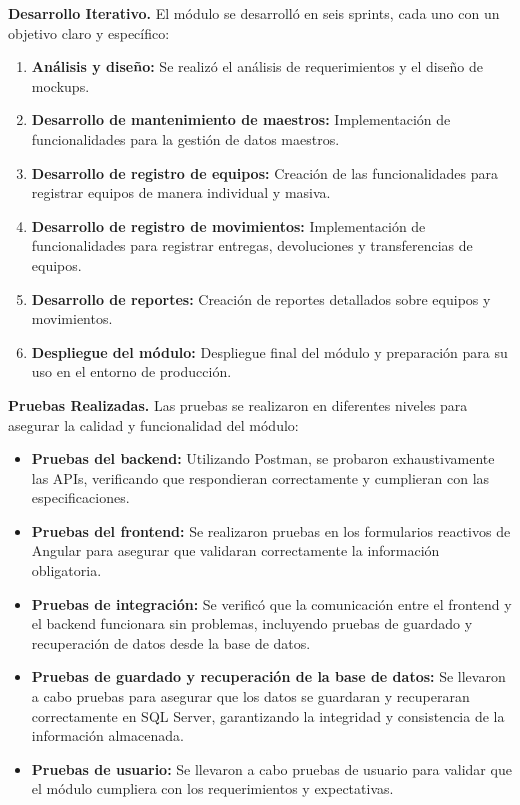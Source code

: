 \documentclass[stu, 12pt, letterpaper, donotrepeattitle, floatsintext, natbib]{apa7}
\begin{document}
\textbf{Desarrollo Iterativo. }El módulo se desarrolló en seis sprints, cada uno con un objetivo claro y específico:
\begin{enumerate}
    \item\textbf{Análisis y diseño: }Se realizó el análisis de requerimientos y el diseño de mockups.
    \item\textbf{Desarrollo de mantenimiento de maestros: }Implementación de funcionalidades para la gestión de datos maestros.
    \item\textbf{Desarrollo de registro de equipos: }Creación de las funcionalidades para registrar equipos de manera individual y masiva.
    \item\textbf{Desarrollo de registro de movimientos: }Implementación de funcionalidades para registrar entregas, devoluciones y
          transferencias de equipos.
    \item\textbf{Desarrollo de reportes: }Creación de reportes detallados sobre equipos y movimientos.
    \item\textbf{Despliegue del módulo: }Despliegue final del módulo y preparación para su uso en el entorno de producción.
\end{enumerate}

\textbf{Pruebas Realizadas. }Las pruebas se realizaron en diferentes niveles para asegurar la calidad y funcionalidad del módulo:
\begin{itemize}
    \item\textbf{Pruebas del backend: }Utilizando Postman, se probaron exhaustivamente las APIs, verificando que respondieran correctamente y
          cumplieran con las especificaciones.
    \item\textbf{Pruebas del frontend: }Se realizaron pruebas en los formularios reactivos de Angular para asegurar que validaran correctamente
          la información obligatoria.
    \item\textbf{Pruebas de integración: }Se verificó que la comunicación entre el frontend y el backend funcionara sin problemas, incluyendo
          pruebas de guardado y recuperación de datos desde la base de datos.
    \item\textbf{Pruebas de guardado y recuperación de la base de datos: }Se llevaron a cabo pruebas para asegurar que los datos se guardaran
          y recuperaran correctamente en SQL Server, garantizando la integridad y consistencia de la información almacenada.
    \item\textbf{Pruebas de usuario: }Se llevaron a cabo pruebas de usuario para validar que el módulo cumpliera con los requerimientos y
          expectativas.
\end{itemize}
\end{document}
